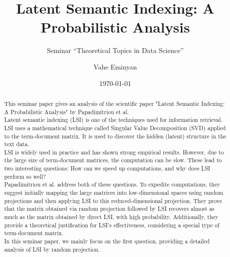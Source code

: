\documentclass[a4paper,11pt,DIV=15]{scrartcl} %
\theoremstyle{plain}
\theoremstyle{definition}
\begin{document}
\subtitle{Seminar ``Theoretical Topics in Data Science''}
\date{\today}
\publishers{RWTH Aachen University}	%

\title{Latent Semantic Indexing: A Probabilistic Analysis}

\author{Vahe Eminyan}

\maketitle


\begin{abstract}
This seminar paper gives an analysis of the scientific paper "Latent Semantic Indexing: A Probabilistic Analysis" by Papadimitriou et al.\\
Latent semantic indexing (LSI) is one of the techniques used for information retrieval.
LSI uses a mathematical technique called Singular Value Decomposition (SVD) applied to the term-document matrix. It is used to discover the hidden (latent) structure in the text data.\\
LSI is widely used in practice and has shown strong empirical results. However, due to the large size of term-document matrices, the computation can be slow.
These lead to two interesting questions: How can we speed up computations, and why does LSI perform so well?\\
Papadimitriou et al. address both of these questions.
To expedite computations, they suggest initially mapping the large matrices into low-dimensional spaces using random projections and then applying LSI to this reduced-dimensional projection.
They prove that the matrix obtained via random projection followed by LSI recovers almost as
much as the matrix obtained by direct LSI, with high probability.
Additionally, they provide a theoretical justification for LSI's effectiveness, considering a special type of term-document matrix.\\
In this seminar paper, we mainly focus on the first question, providing a detailed analysis of LSI by random projection.





\end{abstract}

\thispagestyle{empty}
\end{document}

